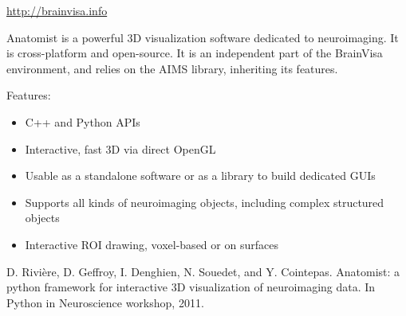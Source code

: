 \documentclass[letterpaper,landscape,english,9pt]{report}
\begin{document}
\begin{multicols}{3}
\url{http://brainvisa.info}
\begin{figure}
\noindent{}
\end{figure}

Anatomist is a powerful 3D visualization software dedicated to neuroimaging.
It is cross-platform and open-source. It is an independent part of the
BrainVisa environment, and relies on the AIMS library, inheriting its features.

Features:
%
\begin{itemize}

\item C++ and Python APIs

\item Interactive, fast 3D via direct OpenGL

\item Usable as a standalone software or as a library to build dedicated GUIs

\item Supports all kinds of neuroimaging objects, including complex structured
objects

\item Interactive ROI drawing, voxel-based or on surfaces

\end{itemize}

D. Rivière, D. Geffroy, I. Denghien, N. Souedet, and Y. Cointepas.
Anatomist: a python framework for interactive 3D visualization of neuroimaging
data. In Python in Neuroscience workshop, 2011.

\end{multicols}
\end{document}

